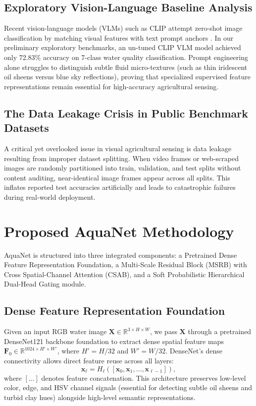 \documentclass[journal]{IEEEtran}
\newcommand{\method}{AquaNet}
\begin{document}
\subsection{Exploratory Vision-Language Baseline Analysis}
Recent vision-language models (VLMs) such as CLIP attempt zero-shot image classification by matching visual features with text prompt anchors \cite{ml_agriculture_review_2023}. In our preliminary exploratory benchmarks, an un-tuned CLIP VLM model achieved only 72.83\% accuracy on 7-class water quality classification. Prompt engineering alone struggles to distinguish subtle fluid micro-textures (such as thin iridescent oil sheens versus blue sky reflections), proving that specialized supervised feature representations remain essential for high-accuracy agricultural sensing.

\subsection{The Data Leakage Crisis in Public Benchmark Datasets}
A critical yet overlooked issue in visual agricultural sensing is data leakage resulting from improper dataset splitting. When video frames or web-scraped images are randomly partitioned into train, validation, and test splits without content auditing, near-identical image frames appear across all splits. This inflates reported test accuracies artificially and leads to catastrophic failures during real-world deployment.

\section{Proposed \method{} Methodology}
\label{sec:proposed_methodology}

\method{} is structured into three integrated components: a Pretrained Dense Feature Representation Foundation, a Multi-Scale Residual Block (MSRB) with Cross Spatial-Channel Attention (CSAB), and a Soft Probabilistic Hierarchical Dual-Head Gating module.

\subsection{Dense Feature Representation Foundation}
Given an input RGB water image $\mathbf{X} \in \mathbb{R}^{3 \times H \times W}$, we pass $\mathbf{X}$ through a pretrained DenseNet121 backbone foundation \cite{densenet_huang_2017} to extract dense spatial feature maps $\mathbf{F}_0 \in \mathbb{R}^{1024 \times H' \times W'}$, where $H' = H/32$ and $W' = W/32$. DenseNet's dense connectivity allows direct feature reuse across all layers:
\begin{equation}
\mathbf{x}_{\ell} = H_{\ell}([\mathbf{x}_0, \mathbf{x}_1, \dots, \mathbf{x}_{\ell-1}]),
\label{eq:densenet}
\end{equation}
where $[\dots]$ denotes feature concatenation. This architecture preserves low-level color, edge, and HSV channel signals (essential for detecting subtle oil sheens and turbid clay hues) alongside high-level semantic representations.
\end{document}
